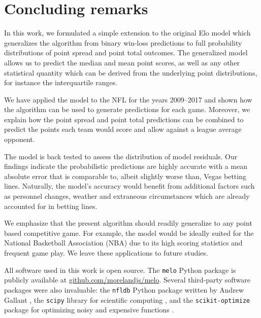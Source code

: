 \documentclass[aps,prc,reprint,amsmath,superscriptaddress,nofootinbib]{revtex4-1}
\begin{document}
\section{Concluding remarks}

In this work, we formulated a simple extension to the original Elo model which generalizes the algorithm from binary win-loss predictions to full probability distributions of point spread and point total outcomes.
The generalized model allows us to predict the median and mean point scores, as well as any other statistical quantity which can be derived from the underlying point distributions, for instance the interquartile ranges. 

We have applied the model to the NFL for the years 2009--2017 and shown how the algorithm can be used to generate predictions for each game.
Moreover, we explain how the point spread and point total predictions can be combined to predict the points each team would score and allow against a league average opponent. 

The model is back tested to assess the distribution of model residuals.
Our findings indicate the probabilistic predictions are highly accurate with a mean absolute error that is comparable to, albeit slightly worse than, Vegas betting lines.
Naturally, the model's accuracy would benefit from additional factors such as personnel changes, weather and extraneous circumstances which are already accounted for in betting lines.

We emphasize that the present algorithm should readily generalize to any point based competitive game.
For example, the model would be ideally suited for the National Basketball Association (NBA) due to its high scoring statistics and frequent game play. 
We leave these applications to future studies.

\medskip

All software used in this work is open source.
The \texttt{melo} Python package is publicly available at \mbox{\url{github.com/morelandjs/melo}}.
Several third-party software packages were also invaluable: the \texttt{nfldb} Python package written by Andrew Gallant \cite{nfldb}, the \texttt{scipy} library for scientific computing \cite{scipy}, and the \texttt{scikit-optimize} package for optimizing noisy and expensive functions \cite{skopt}. 


\end{document}

